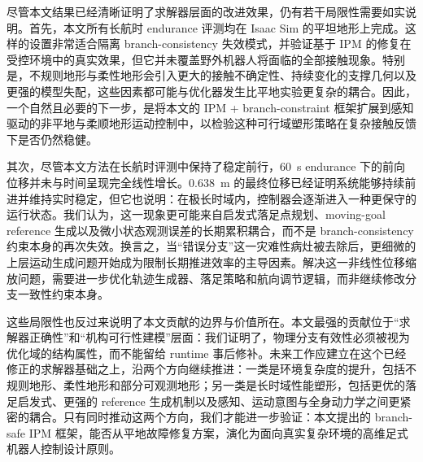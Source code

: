 尽管本文结果已经清晰证明了求解器层面的改进效果，仍有若干局限性需要如实说明。首先，本文所有长航时 endurance 评测均在 Isaac Sim 的平坦地形上完成。这样的设置非常适合隔离 branch-consistency 失效模式，并验证基于 IPM 的修复在受控环境中的真实效果，但它并未覆盖野外机器人将面临的全部接触现象。特别是，不规则地形与柔性地形会引入更大的接触不确定性、持续变化的支撑几何以及更强的模型失配，这些因素都可能与优化器发生比平地实验更复杂的耦合。因此，一个自然且必要的下一步，是将本文的 IPM + branch-constraint 框架扩展到感知驱动的非平地与柔顺地形运动控制中，以检验这种可行域塑形策略在复杂接触反馈下是否仍然稳健。

其次，尽管本文方法在长航时评测中保持了稳定前行，60~s endurance 下的前向位移并未与时间呈现完全线性增长。0.638~m 的最终位移已经证明系统能够持续前进并维持实时稳定，但它也说明：在极长时域内，控制器会逐渐进入一种更保守的运行状态。我们认为，这一现象更可能来自启发式落足点规划、moving-goal reference 生成以及微小状态观测误差的长期累积耦合，而不是 branch-consistency 约束本身的再次失效。换言之，当“错误分支”这一灾难性病灶被去除后，更细微的上层运动生成问题开始成为限制长期推进效率的主导因素。解决这一非线性位移缩放问题，需要进一步优化轨迹生成器、落足策略和航向调节逻辑，而非继续修改分支一致性约束本身。

这些局限性也反过来说明了本文贡献的边界与价值所在。本文最强的贡献位于“求解器正确性”和“机构可行性建模”层面：我们证明了，物理分支有效性必须被视为优化域的结构属性，而不能留给 runtime 事后修补。未来工作应建立在这个已经修正的求解器基础之上，沿两个方向继续推进：一类是环境复杂度的提升，包括不规则地形、柔性地形和部分可观测地形；另一类是长时域性能塑形，包括更优的落足启发式、更强的 reference 生成机制以及感知、运动意图与全身动力学之间更紧密的耦合。只有同时推动这两个方向，我们才能进一步验证：本文提出的 branch-safe IPM 框架，能否从平地故障修复方案，演化为面向真实复杂环境的高维足式机器人控制设计原则。
